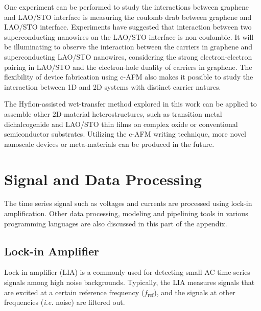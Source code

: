 \documentclass[pdflatex, sectionletters, 12pt, final, phd]{pittetd}    %
\begin{document}
One experiment can be performed to study the interactions between graphene and LAO/STO interface is measuring the coulomb drab between graphene and LAO/STO interface. Experiments have suggested that interaction between two superconducting nanowires on the LAO/STO interface is non-coulombic\cite{tang2017non, tang2017magnetically}. It will be illuminating to observe the interaction between the carriers in graphene and superconducting LAO/STO nanowires, considering the strong electron-electron pairing in LAO/STO and the electron-hole duality of carriers in graphene. The flexibility of device fabrication using c-AFM also makes it possible to study the interaction between 1D and 2D systems with distinct carrier natures.

The Hyflon-assisted wet-transfer method explored in this work can be applied to assemble other 2D-material heterostructures, such as transition metal dichalcogenide and LAO/STO thin films on complex oxide or conventional semiconductor substrates. Utilizing the c-AFM writing technique, more novel nanoscale devices or meta-materials can be produced in the future.

%
\appendix                          %

\chapter{Signal and Data Processing}

The time series signal such as voltages and currents are processed using lock-in amplification. Other data processing, modeling and pipelining tools in various programming languages are also discussed in this part of the appendix.

\section{Lock-in Amplifier}

Lock-in amplifier (LIA) is a commonly used for detecting small AC time-series signals among high noise backgrounds. Typically, the LIA measures signals that are excited at a certain reference frequency ($f_\mathrm{ref}$), and the signals at other frequencies (\textit{i.e.} noise) are filtered out.
\end{document}
